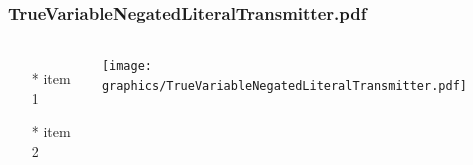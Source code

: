 \begin{frame} \frametitle{TrueVariableNegatedLiteralTransmitter.pdf}
    \begin{columns}[c]
        \begin{itemize}
            \item[*] item 1
            \item[*] item 2
        \end{itemize}
        \begin{minipage}{\linewidth}
            \begin{center}
            \texttt{[image: graphics/TrueVariableNegatedLiteralTransmitter.pdf]}
            \label{gfx:TrueVariableNegatedLiteralTransmitter.pdf}
            \end{center}
        \end{minipage}
    \end{columns}
\end{frame}
